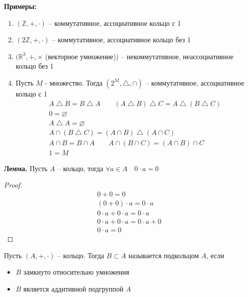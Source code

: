 \textbf{Примеры:}
\begin{enumerate}
    \item $(\mathbb{Z}, +, \cdot)$ -- коммутативное, ассоциативное кольцо с 1 
    \item $(2\mathbb{Z}, +, \cdot)$ -- коммутативное, ассоциативное кольцо без 1
    \item $(\mathbb{R}^3, +, \times $ (векторное умножение)) -- некоммутативное, неассоциативное кольцо без 1
    \item Пусть $M$ - множество. Тогда $(2^M, \bigtriangleup, \cap)$ -- коммутативное, ассоциативное кольцо с 1 
    \begin{gather*}
        A \bigtriangleup B = B \bigtriangleup A \quad\quad (A \bigtriangleup B) \bigtriangleup C = A \bigtriangleup (B \bigtriangleup C) \\
        0 = \varnothing \\
        A \bigtriangleup A = \varnothing \\
        A  \cap (B \bigtriangleup C) = (A \cap B) \bigtriangleup (A \cap C) \\
        A \cap B = B \cap A \quad\quad A \cap (B \cap C) = (A \cap B) \cap C \\
        1 = M
    \end{gather*}
\end{enumerate}
\textbf{Лемма.} Пусть $A$ -- кольцо, тогда $\forall a \in A \quad 0 \cdot a = 0$
\begin{proof}
    \begin{gather*}
        0 + 0 = 0 \\
        (0 + 0) \cdot a = 0 \cdot a \\
        0 \cdot a + 0 \cdot a = 0 \cdot a \\
        0 \cdot a + 0 \cdot a = 0 \cdot a + 0 \\
        0 \cdot a = 0
    \end{gather*}
\end{proof}
\begin{conj}
    Пусть $(A, +, \cdot)$ -- кольцо. Тогда $B \subset A$ называется подкольцом $A$, если 
    \begin{itemize}
        \item $B$ замкнуто относительно умножения 
        \item $B$ является аддитивной подгруппой $A$
    \end{itemize}
\end{conj}
\vspace{0.7cm}
  
